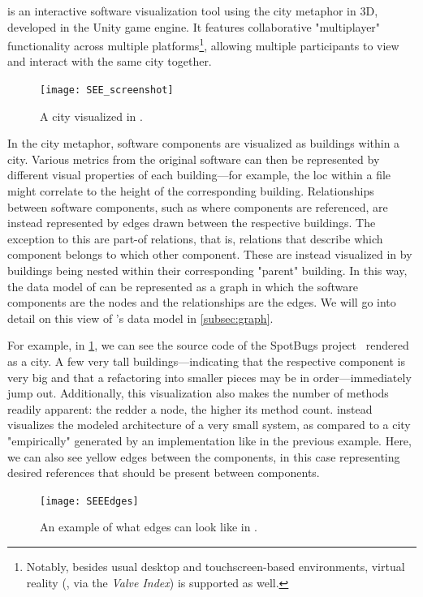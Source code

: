 \documentclass[../thesis]{subfiles}
\begin{document}
\SEE{} is an interactive software visualization tool using the \gls*{city} metaphor in 3D, developed in the {Unity} game engine.
It features collaborative "multiplayer" functionality across multiple platforms\footnote{
	Notably, besides usual desktop and touchscreen-based environments, virtual reality (\eg, via the \emph{Valve Index}) is supported as well.
}, allowing multiple participants to view and interact with the same \gls*{city} together.

\begin{figure}[hbtp]
	\centering
	\texttt{[image: SEE\_screenshot]}
	\caption{A \gls{city} visualized in \SEE{}.}\label{fig:city}
\end{figure}

In the \gls{city} metaphor, software components are visualized as buildings within a city.
Various metrics from the original software can then be represented by different visual properties of each building---for example, the \gls{loc} within a file might correlate to the height of the corresponding building.
Relationships between software components, such as where components are referenced, are instead represented by edges drawn between the respective buildings.
The exception to this are part-of relations, that is, relations that describe which component belongs to which other component.
These are instead visualized in \SEE{} by buildings being nested within their corresponding "parent" building.
In this way, the data model of \SEE{} can be represented as a graph in which the software components are the nodes and the relationships are the edges.
We will go into detail on this view of \SEE{}'s data model in \cref{subsec:graph}.

For example, in \cref{fig:city}, we can see the source code of the SpotBugs project~\cite{spotbugs} rendered as a \gls{city}.
A few very tall buildings---indicating that the respective component is very big and that a refactoring into smaller pieces may be in order---immediately jump out.
Additionally, this visualization also makes the number of methods readily apparent:
the redder a node, the higher its method count.
 instead visualizes the modeled architecture of a very small system, as compared to a city "empirically" generated by an implementation like in the previous example.
Here, we can also see yellow edges between the components, in this case representing desired references that should be present between components.

\begin{figure}[hbtp]
	\begin{center}
		\texttt{[image: SEEEdges]}
	\end{center}
	\caption{An example of what edges can look like in \SEE{}.}\label{fig:edges}
\end{figure}
\end{document}
